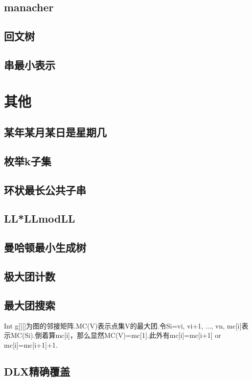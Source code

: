 \documentclass[landscape,a4paper]{article}
\begin{document}
\begin{spacing}{0.3}
\begin{multicols}{3}
	\subsection{manacher}
	
	\subsection{回文树}
	
	\subsection{串最小表示}
	
	
	\section{其他}
	\subsection{某年某月某日是星期几}
	
	\subsection{枚举k子集}
	
	\subsection{环状最长公共子串}
	
	\subsection{LL*LLmodLL}
	
	\subsection{曼哈顿最小生成树}
	
	\subsection{极大团计数}
	
	\subsection{最大团搜索}
	Int g[][]为图的邻接矩阵.MC(V)表示点集V的最大团.令Si={vi, vi+1, ..., vn}, mc[i]表示MC(Si).倒着算mc[i]，那么显然MC(V)=mc[1].此外有mc[i]=mc[i+1] or mc[i]=mc[i+1]+1.
	
	\subsection{DLX精确覆盖}
	

\end{multicols}
\end{spacing}
\end{document}
